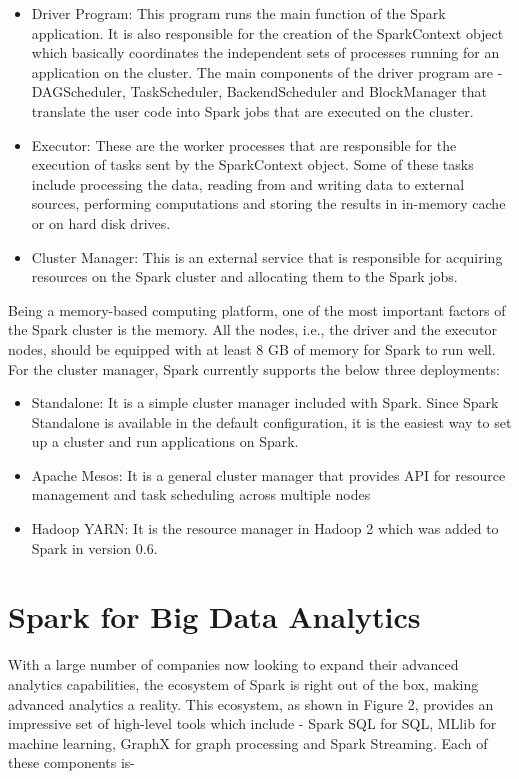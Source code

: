 \documentclass[sigconf]{acmart}
\begin{document}
\begin{itemize}
	\item Driver Program: This program runs the main function of the Spark application. It is also responsible for the creation of the SparkContext object which basically coordinates the independent sets of processes running for an application on the cluster. The main components of the driver program are - DAGScheduler, TaskScheduler, BackendScheduler and BlockManager that translate the user code into Spark jobs that are executed on the cluster.
	\item Executor: These are the worker processes that are responsible for the execution of tasks sent by the SparkContext object. Some of these tasks include processing the data, reading from and writing data to external sources, performing computations and storing the results in in-memory cache or on hard disk drives.
	\item Cluster Manager: This is an external service that is responsible for acquiring resources on the Spark cluster and allocating them to the Spark jobs.
\end{itemize}

Being a memory-based computing platform, one of the most important factors of the Spark cluster is the memory. All the nodes, i.e., the driver and the executor nodes, should be equipped with at least 8 GB of memory for Spark to run well. For the cluster manager, Spark currently supports the below three deployments\cite{fu2016spark_p1}:

\begin{itemize}
	\item Standalone: It is a simple cluster manager included with Spark. Since Spark Standalone is available in the default configuration, it is the easiest way to set up a cluster and run applications on Spark.
	\item Apache Mesos: It is a general cluster manager that provides API for resource management and task scheduling across multiple nodes
	\item Hadoop YARN: It is the resource manager in Hadoop 2 which was added to Spark in version 0.6.
\end{itemize}

\section{Spark for Big Data Analytics}
With a large number of companies now looking to expand their advanced analytics capabilities, the ecosystem of Spark is right out of the box, making advanced analytics a reality. This ecosystem, as shown in Figure 2, provides an impressive set of high-level tools which include - Spark SQL for SQL, MLlib for machine learning, GraphX for graph processing and Spark Streaming\cite{fu2016spark_p1}. Each of these components is-
\end{document}
